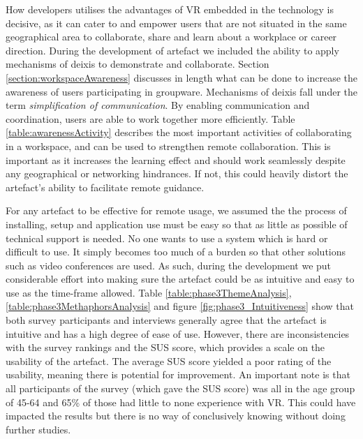 
How developers utilises the advantages of VR embedded in the technology is decisive, as it can cater to and empower users that are not situated in the same geographical area to collaborate, share and learn about a workplace or career direction. During the development of artefact we included the ability to apply mechanisms of deixis to demonstrate and collaborate. Section \ref{section:workspaceAwareness} discusses in length what can be done to increase the awareness of users participating in groupware. Mechanisms of deixis fall under the term \textit{simplification of communication}. By enabling communication and coordination, users are able to work together more efficiently. Table \ref{table:awarenessActivity} describes the most important activities of collaborating in a workspace, and can be used to strengthen remote collaboration. This is important as it increases the learning effect \cite{stahl2006computer} and should work seamlessly despite any geographical or networking hindrances. If not, this could heavily distort the artefact's ability to facilitate remote guidance.


For any artefact to be effective for remote usage, we assumed the the process of installing, setup and application use must be easy so that as little as possible of technical support is needed. No one wants to use a system which is hard or difficult to use. It simply becomes too much of a burden so that other solutions such as video conferences are used. As such, during the development we put considerable effort into making sure the artefact could be as intuitive and easy to use as the time-frame allowed. Table \ref{table:phase3ThemeAnalysis}, \ref{table:phase3MethaphorsAnalysis} and figure \ref{fig:phase3_Intuitiveness} show that both survey participants and interviews generally agree that the artefact is intuitive and has a high degree of ease of use. However, there are inconsistencies with the survey rankings and the SUS score, which provides a scale on the usability of the artefact. The average  SUS score yielded a poor rating of the usability, meaning there is potential for improvement. An important note is that all participants of the survey (which gave the SUS score) was all in the age group of 45-64 and 65\% of those had little to none experience with VR. This could have impacted the results but there is no way of conclusively knowing without doing further studies.  

